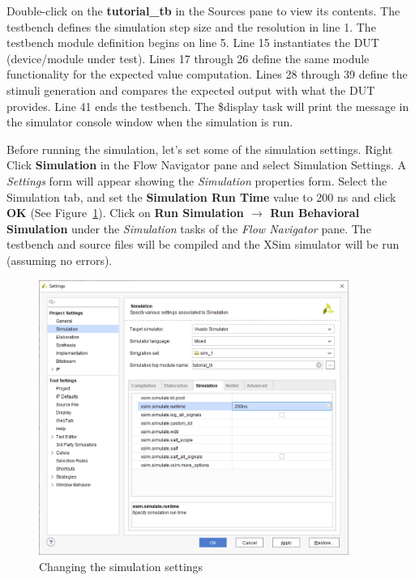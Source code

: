 \documentclass[11pt]{article}
\begin{document}
Double-click on the \textbf{tutorial\_tb} in the Sources pane to view its contents. The testbench defines the simulation step size and the resolution in line 1. The testbench module definition begins on line 5. Line 15 instantiates the DUT (device/module under test). Lines 17 through 26 define the same module functionality for the expected value computation. Lines 28 through 39 define the stimuli generation and compares the expected output with what the DUT provides. Line 41 ends the testbench. The \$display task will print the message in the simulator console window when the simulation is run.

Before running the simulation, let's set some of the simulation settings. Right Click \textbf{Simulation} in the Flow Navigator pane and select Simulation Settings. A \textit{Settings} form will appear showing the \textit{Simulation} properties form. Select the Simulation tab, and set the \textbf{Simulation Run Time} value to 200 ns and click \textbf{OK} (See Figure~\ref{fig:sim_settings}). Click on \textbf{Run Simulation $\rightarrow$ Run Behavioral Simulation} under the \textit{Simulation} tasks of the \textit{Flow Navigator} pane. The testbench and source files will be compiled and the XSim simulator will be run (assuming no errors). 

\begin{figure}[!h]
    \centering
    \includegraphics[width=0.9\textwidth]{images/sim_settings.png}
    \caption{Changing the simulation settings}
    \label{fig:sim_settings}
\end{figure}
\end{document}
